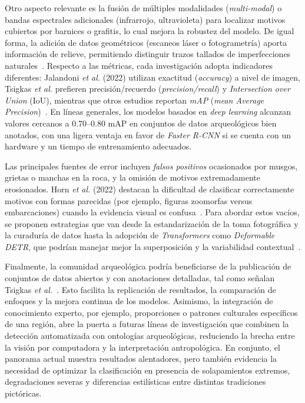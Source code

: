 Otro aspecto relevante es la fusión de múltiples modalidades (\textit{multi-modal}) o bandas espectrales adicionales (infrarrojo, ultravioleta) para localizar motivos cubiertos por barnices o grafitis, lo cual mejora la robustez del modelo.
De igual forma, la adición de datos geométricos (escaneos láser o fotogrametría) aporta información de relieve, permitiendo distinguir trazos tallados de imperfecciones naturales~\cite{horn2022}.
Respecto a las métricas, cada investigación adopta indicadores diferentes: Jalandoni \textit{et al.} (2022) utilizan exactitud (\textit{accuracy}) a nivel de imagen, Tsigkas \textit{et al.} prefieren precisión/recuerdo (\textit{precision/recall}) y \textit{Intersection over Union} (IoU), mientras que otros estudios reportan \textit{mAP} (\textit{mean Average Precision})~\cite{jalandoni2022,tsigkas2020,davis2021}.
En líneas generales, los modelos basados en \textit{deep learning} alcanzan valores cercanos a 0.70–0.80 mAP en conjuntos de datos arqueológicos bien anotados, con una ligera ventaja en favor de \textit{Faster R-CNN} si se cuenta con un hardware y un tiempo de entrenamiento adecuados.

Las principales fuentes de error incluyen \emph{falsos positivos} ocasionados por musgos, grietas o manchas en la roca, y la omisión de motivos extremadamente erosionados.
Horn \textit{et al.} (2022) destacan la dificultad de clasificar correctamente motivos con formas parecidas (por ejemplo, figuras zoomorfas versus embarcaciones) cuando la evidencia visual es confusa~\cite{horn2022}.
Para abordar estos vacíos, se proponen estrategias que van desde la estandarización de la toma fotográfica y la curaduría de datos hasta la adopción de \textit{Transformers} como \textit{Deformable DETR}, que podrían manejar mejor la superposición y la variabilidad contextual~\cite{zhu2021}.

Finalmente, la comunidad arqueológica podría beneficiarse de la publicación de conjuntos de datos abiertos y con anotaciones detalladas, tal como señalan Tsigkas \textit{et al.}~\cite{tsigkas2020}.
Esto facilita la replicación de resultados, la comparación de enfoques y la mejora continua de los modelos.
Asimismo, la integración de conocimiento experto, por ejemplo, proporciones o patrones culturales específicos de una región, abre la puerta a futuras líneas de investigación que combinen la detección automatizada con ontologías arqueológicas, reduciendo la brecha entre la visión por computadora y la interpretación antropológica.
En conjunto, el panorama actual muestra resultados alentadores, pero también evidencia la necesidad de optimizar la clasificación en presencia de solapamientos extremos, degradaciones severas y diferencias estilísticas entre distintas tradiciones pictóricas.

